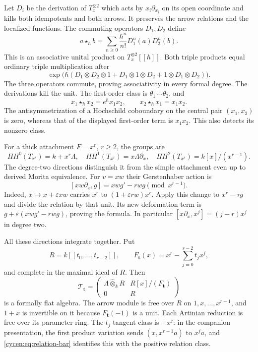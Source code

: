 Let $D_i$ be the derivation of $T_x^{\otimes2}$ which acts
by $x_i\partial_{x_i}$ on its open coordinate and kills
both idempotents and both arrows. It preserves the arrow
relations and the localized functions. The commuting
operators $D_1,D_2$ define
\begin{equation}\label{cycen:eq:log-twist}
 a\star_\hbar b=\sum_{n\geq0}\frac{\hbar^n}{n!}
                        D_1^n(a)D_2^n(b).
\end{equation}
This is an associative unital product on
$T_x^{\otimes2}[[\hbar]]$. Both triple products equal ordinary
triple multiplication after
\[
 \exp\bigl(\hbar(D_1\otimes D_2\otimes1
                  +D_1\otimes1\otimes D_2
                  +1\otimes D_1\otimes D_2)\bigr).
\]
The three operators commute, proving associativity in every
formal degree. The derivations kill the unit. The first-order
class is $\theta_1\smile\theta_2$, and
\[
 x_1\star_\hbar x_2=e^\hbar x_1x_2,
 \qquad x_2\star_\hbar x_1=x_1x_2.
\]
The antisymmetrization of a Hochschild coboundary on the
central pair $(x_1,x_2)$ is zero, whereas that of the displayed
first-order term is $x_1x_2$. This also detects its nonzero class.

For a thick attachment $F=x^r$, $r\geq2$, the groups are
\[
 HH^0(T_{x^r})=k+x^r\Lambda,\quad
 HH^1(T_{x^r})=x\Lambda\partial_x,\quad
 HH^2(T_{x^r})=k[x]/(x^{r-1}).
\]
The degree-two directions distinguish it from the simple
attachment even up to derived Morita equivalence. For
$v=xw$ their Gerstenhaber action is
\begin{equation}\label{cycen:eq:thick-bracket}
 [xw\partial_x,g]=xwg'-rwg\pmod{x^{r-1}}.
\end{equation}
Indeed, $x\mapsto x+\varepsilon xw$ carries $x^r$ to
$(1+\varepsilon rw)x^r$. Apply this change to $x^r-\tau g$
and divide the relation by that unit. Its new deformation
term is $g+\varepsilon(xwg'-rwg)$, proving the formula.
In particular $[x\partial_x,x^j]=(j-r)x^j$ in degree two.

All these directions integrate together. Put
\[
 R=k[[t_0,\ldots,t_{r-2}]],\qquad
 F_{\mathbf t}(x)=x^r-\sum_{j=0}^{r-2}t_jx^j,
\]
and complete in the maximal ideal of $R$. Then
\begin{equation}\label{cycen:eq:formal-attaching}
 \mathcal T_{\mathbf t}=
 \begin{pmatrix}
 \Lambda\widehat\otimes_k R&R[x]/(F_{\mathbf t})\\0&R
 \end{pmatrix}
\end{equation}
is a formally flat algebra. The arrow module is free over
$R$ on $1,x,\ldots,x^{r-1}$, and $1+x$ is invertible on
it because $F_{\mathbf t}(-1)$ is a unit. Each Artinian
reduction is free over its parameter ring. The $t_j$ tangent
class is $+x^j$: in the companion presentation, the first
product variation sends $(x,x^{r-1}a)$ to $x^ja$, and
\eqref{cycen:eq:relation-bar} identifies this with the
positive relation class.

